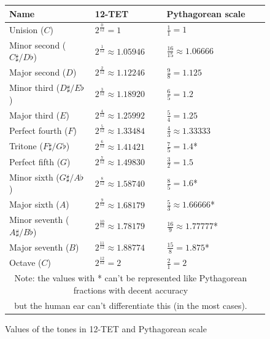 \documentclass[]{article}
\begin{document}
                \begin{figure}[h]
                    \begin{center}
                        \begin{tabular}{| l | l | l | l |}
                            \hline
                            \textbf{Name} & \textbf{12-TET} & \textbf{Pythagorean scale}\\\hline
                            Unision ($C$) & $2^\frac{0}{12} = 1$ & $\frac{1}{1} = 1$ \\ \hline
                            Minor second ($C\sharp/D\flat$) & $2^\frac{1}{12} \approx 1.05946$ & $\frac{16}{15} \approx 1.06666$\\ \hline
                            Major second ($D$) & $2^\frac{2}{12} \approx 1.12246$ & $\frac{9}{8} = 1.125$ \\ \hline
                            Minor third ($D\sharp/E\flat$) & $2^\frac{3}{12} \approx 1.18920$ & $\frac{6}{5} = 1.2$ \\ \hline
                            Major third ($E$) & $2^\frac{4}{12} \approx 1.25992$ & $\frac{5}{4} = 1.25$ \\ \hline
                            Perfect fourth ($F$) & $2^\frac{5}{12} \approx 1.33484$ & $\frac{4}{3} \approx 1.33333$ \\ \hline
                            Tritone ($F\sharp/G\flat$) & $2^\frac{6}{12} \approx 1.41421$ & $\frac{7}{5} = 1.4$* \\ \hline
                            Perfect fifth ($G$) & $2^\frac{7}{12} \approx 1.49830$ & $\frac{3}{2} = 1.5$ \\ \hline
                            Minor sixth ($G\sharp/A\flat$) & $2^\frac{8}{12} \approx 1.58740$ & $\frac{8}{5} = 1.6$* \\ \hline
                            Major sixth ($A$) & $2^\frac{9}{12} \approx 1.68179$ & $\frac{5}{3} \approx 1.66666$* \\ \hline
                            Minor seventh ($A\sharp/B\flat$) & $2^\frac{10}{12} \approx 1.78179$ & $\frac{16}{9} \approx 1.77777$* \\ \hline
                            Major seventh ($B$) & $2^\frac{11}{12} \approx 1.88774$ & $\frac{15}{8} = 1.875$* \\ \hline
                            Octave ($C$) & $2^\frac{12}{12} = 2$ & $\frac{2}{1} = 2$ \\ \hline
                            \multicolumn{3}{c}{Note: the values with * can't be represented like Pythagorean fractions with decent accuracy}\\
                            \multicolumn{3}{c}{but the human ear can't differentiate this (in the most cases).}\\
                        \end{tabular}
                        \caption{Values of the tones in 12-TET and Pythagorean scale}
                    \end{center}
                \end{figure}
\end{document}
